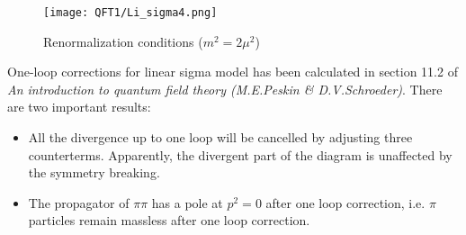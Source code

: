 \begin{figure}[!h]
\centering
\texttt{[image: QFT1/Li\_sigma4.png]}
\caption{Renormalization conditions ($m^2 = 2\mu^2$)}
\end{figure}
One-loop corrections for linear sigma model has been calculated in section 11.2 of \emph{An introduction to quantum field theory (M.E.Peskin \& D.V.Schroeder)}. There are two important results:
\begin{itemize}
\item All the divergence up to one loop will be cancelled by adjusting three counterterms. Apparently, the divergent part of the diagram is unaffected by the symmetry breaking.
\item The propagator of $\pi\pi$ has a pole at $p^2 = 0$ after one loop correction, i.e. $\pi$ particles remain massless after one loop correction.
\end{itemize}

